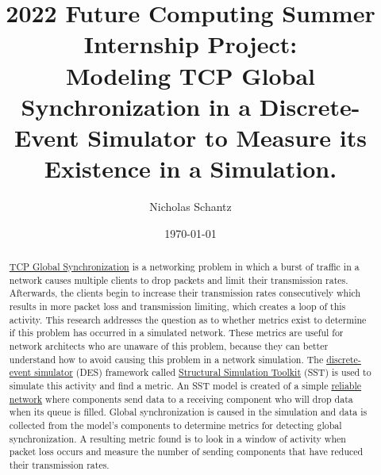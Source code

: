 \documentclass{article}
\begin{document}
    \begin{minipage}[h]{\textwidth}
        \title{2022 Future Computing Summer Internship Project:\\Modeling TCP Global Synchronization in a Discrete-Event Simulator to Measure its Existence in a Simulation.}
        \author{Nicholas Schantz}
        \date{\today}
            \maketitle
        \begin{abstract}
            \href{https://en.wikipedia.org/wiki/TCP_global_synchronization}{TCP Global Synchronization} is a networking problem in which a burst of traffic in a network causes multiple clients to drop packets and limit their transmission rates. Afterwards, the clients begin to increase their transmission rates consecutively which results in more packet loss and transmission limiting, which creates a loop of this activity. This research addresses the question as to whether metrics exist to determine if this problem has occurred in a simulated network. These metrics are useful for network architects who are unaware of this problem, because they can better understand how to avoid causing this problem in a network simulation. The \href{https://en.wikipedia.org/wiki/Discrete-event_simulation}{discrete-event simulator} (DES) framework called \href{http://sst-simulator.org/}{Structural Simulation Toolkit} (SST) is used to simulate this activity and find a metric. An SST model is created of a simple \href{https://en.wikipedia.org/wiki/Reliability_(computer_networking}{reliable network} where components send data to a receiving component who will drop data when its queue is filled. Global synchronization is caused in the simulation and data is collected from the model's components to determine metrics for detecting global synchronization. A resulting metric found is to look in a window of activity when packet loss occurs and measure the number of sending components that have reduced their transmission rates.

        \end{abstract}
    \end{minipage}

\ \\


\end{document}
